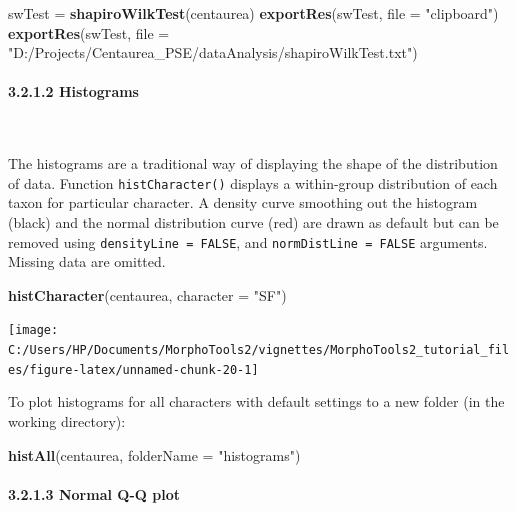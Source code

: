 \documentclass[
]{article}
\newenvironment{Shaded}{\begin{snugshade}}{\end{snugshade}}
\newcommand{\DataTypeTok}[1]{\textcolor[rgb]{0.13,0.29,0.53}{#1}}
\newcommand{\KeywordTok}[1]{\textcolor[rgb]{0.13,0.29,0.53}{\textbf{#1}}}
\newcommand{\NormalTok}[1]{#1}
\newcommand{\StringTok}[1]{\textcolor[rgb]{0.31,0.60,0.02}{#1}}
\begin{document}
\begin{Shaded}
\begin{Highlighting}[]
\NormalTok{swTest =}\StringTok{ }\KeywordTok{shapiroWilkTest}\NormalTok{(centaurea)}
\KeywordTok{exportRes}\NormalTok{(swTest, }\DataTypeTok{file =} \StringTok{"clipboard"}\NormalTok{)}
\KeywordTok{exportRes}\NormalTok{(swTest, }\DataTypeTok{file =} \StringTok{"D:/Projects/Centaurea_PSE/dataAnalysis/shapiroWilkTest.txt"}\NormalTok{)}
\end{Highlighting}
\end{Shaded}

\hypertarget{histograms}{%
\paragraph{3.2.1.2 Histograms}\label{histograms}}

~

The histograms are a traditional way of displaying the shape of the
distribution of data. Function \texttt{histCharacter()} displays a
within-group distribution of each taxon for particular character. A
density curve smoothing out the histogram (black) and the normal
distribution curve (red) are drawn as default but can be removed using
\texttt{densityLine\ =\ FALSE}, and \texttt{normDistLine\ =\ FALSE}
arguments. Missing data are omitted.

\begin{Shaded}
\begin{Highlighting}[]
\KeywordTok{histCharacter}\NormalTok{(centaurea, }\DataTypeTok{character =} \StringTok{"SF"}\NormalTok{)}
\end{Highlighting}
\end{Shaded}

\begin{center}\texttt{[image: C:/Users/HP/Documents/MorphoTools2/vignettes/MorphoTools2\_tutorial\_files/figure-latex/unnamed-chunk-20-1]} \end{center}

To plot histograms for all characters with default settings to a new
folder (in the working directory):

\begin{Shaded}
\begin{Highlighting}[]
\KeywordTok{histAll}\NormalTok{(centaurea, }\DataTypeTok{folderName =} \StringTok{"histograms"}\NormalTok{)}
\end{Highlighting}
\end{Shaded}

\hypertarget{normal-q-q-plot}{%
\paragraph{3.2.1.3 Normal Q-Q plot}\label{normal-q-q-plot}}
\end{document}
